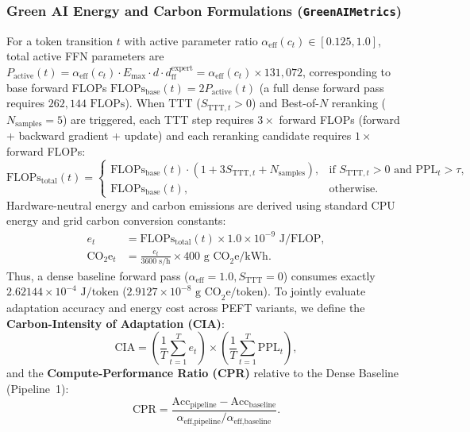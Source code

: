 \documentclass{interact}
\begin{document}
\subsubsection{Green AI Energy and Carbon Formulations (\texttt{GreenAIMetrics})}

For a token transition $t$ with active parameter ratio $\alpha_{\text{eff}}(c_t) \in [0.125, 1.0]$, total active FFN parameters are $P_{\text{active}}(t) = \alpha_{\text{eff}}(c_t) \cdot E_{\max} \cdot d \cdot d_{\text{ff}}^{\text{expert}} = \alpha_{\text{eff}}(c_t) \times 131,072$, corresponding to base forward FLOPs $\text{FLOPs}_{\text{base}}(t) = 2 P_{\text{active}}(t)$ (a full dense forward pass requires $262,144\text{ FLOPs}$). When TTT ($S_{\text{TTT},t} > 0$) and Best-of-$N$ reranking ($N_{\text{samples}} = 5$) are triggered, each TTT step requires $3\times$ forward FLOPs (forward + backward gradient + update) and each reranking candidate requires $1\times$ forward FLOPs:
\begin{equation}
    \text{FLOPs}_{\text{total}}(t) = \begin{cases}
        \text{FLOPs}_{\text{base}}(t) \cdot \left(1 + 3 S_{\text{TTT},t} + N_{\text{samples}}\right), & \text{if } S_{\text{TTT},t} > 0 \text{ and } \text{PPL}_t > \tau, \\[4pt]
        \text{FLOPs}_{\text{base}}(t),                                                                & \text{otherwise}.
    \end{cases}
    \label{eq:total_flops}
\end{equation}
Hardware-neutral energy and carbon emissions are derived using standard CPU energy and grid carbon conversion constants:
\begin{align}
    e_t                   & = \text{FLOPs}_{\text{total}}(t) \times 1.0 \times 10^{-9}\text{ J/FLOP}, \label{eq:joules} \\
    \text{CO}_2\text{e}_t & = \frac{e_t}{3600\text{ s/h}} \times 400\text{ g CO}_2\text{e/kWh}. \label{eq:co2e}
\end{align}
Thus, a dense baseline forward pass ($\alpha_{\text{eff}} = 1.0, S_{\text{TTT}} = 0$) consumes exactly $2.62144 \times 10^{-4}\text{ J/token}$ ($2.9127 \times 10^{-8}\text{ g CO}_2\text{e/token}$). To jointly evaluate adaptation accuracy and energy cost across PEFT variants, we define the \textbf{Carbon-Intensity of Adaptation (CIA)}:
\begin{equation}
    \text{CIA} = \left(\frac{1}{T}\sum_{t=1}^{T} e_t\right) \times \left(\frac{1}{T}\sum_{t=1}^{T} \text{PPL}_t\right),
    \label{eq:cia}
\end{equation}
and the \textbf{Compute-Performance Ratio (CPR)} relative to the Dense Baseline (Pipeline~1):
\begin{equation}
    \text{CPR} = \frac{\text{Acc}_{\text{pipeline}} - \text{Acc}_{\text{baseline}}}{\alpha_{\text{eff,pipeline}} / \alpha_{\text{eff,baseline}}}.
    \label{eq:cpr}
\end{equation}
\end{document}
